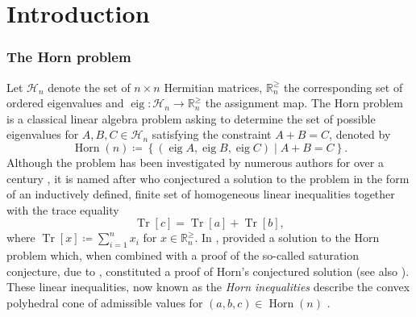 \documentclass[notitlepage, 11pt, letterpaper]{amsart}
\theoremstyle{plain}
\theoremstyle{definition}
\DeclareMathOperator{\Tr}{Tr}
\DeclareMathOperator{\Horn}{Horn}
\DeclareMathOperator{\eig}{eig}
\newcommand{\herm}[1]{\mathcal H_{#1}}
\newcommand{\eigs}[1]{\mathbb R^{\geq}_{#1}}
\newcommand{\ea}{a}
\newcommand{\eb}{b}
\newcommand{\ec}{c}
\newcommand{\ex}{x}
\newcommand{\tex}{\Tr[\ex]}
\begin{document}
\section{Introduction}

\subsubsection*{The Horn problem}
Let $\herm{n}$ denote the set of $n\times n$ Hermitian matrices, $\eigs{n}$ the corresponding set of ordered eigenvalues and $\eig : \herm{n} \to \eigs{n}$ the assignment map.
The Horn problem is a classical linear algebra problem asking to determine the set of possible eigenvalues for $A,B,C \in \herm{n}$ satisfying the constraint $A+B=C$, denoted by
\begin{equation}
    \Horn(n) \coloneqq \left\{ (\eig A, \eig B, \eig C) \middle| A + B = C \right\}.
\end{equation}
Although the problem has been investigated by numerous authors for over a century \cite{weyl1912asymptotische,fan1949theorem,lidskii1953proper,wielandt1955extremum,thompson1971eigenvalues,thompson1970eigenvalues}, it is named after \citeauthor{horn1962eigenvalues} who conjectured a solution to the problem in the form of an inductively defined, finite set of homogeneous linear inequalities \cite{horn1962eigenvalues} together with the trace equality
\begin{equation}
    \Tr[c] = \Tr[a] + \Tr[b],
\end{equation}
where $\tex \coloneqq \sum_{i=1}^{n} \ex_i$ for $\ex \in \eigs{n}$.
In \citeyear{klyachko1998stable}, \citeauthor{klyachko1998stable} provided a solution to the Horn problem \cite{klyachko1998stable} which, when combined with a proof of the so-called saturation conjecture, due to \citeauthor{knutson1999honeycomb} \cite{knutson1999honeycomb}, constituted a proof of Horn's conjectured solution \cite{fulton1998eigenvalues} (see also \cite{alekseev2017symplectic}).
These linear inequalities, now known as the \textit{Horn inequalities} describe the convex polyhedral cone of admissible values for $(\ea,\eb,\ec) \in \Horn(n)$ \cite{bhatia2001linear,knutson2000symplectic,fulton2000eigenvalues,niculescu2006convex}.
\end{document}
